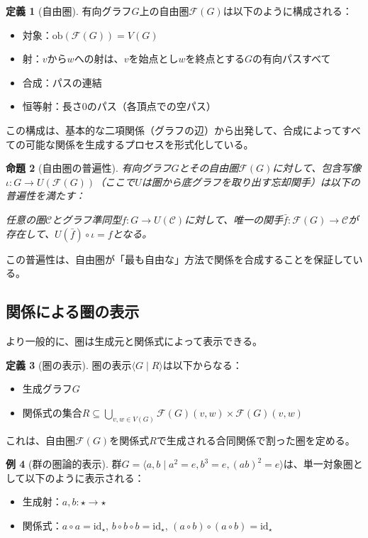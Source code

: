 \documentclass[11pt,a4paper,twocolumn]{ltjsarticle}
\theoremstyle{definition}
\newtheorem{definition}{定義}[section]
\newtheorem{example}[definition]{例}
\theoremstyle{plain}
\newtheorem{proposition}[definition]{命題}
\newcommand{\ob}{\mathrm{ob}}
\newcommand{\id}{\mathrm{id}}
\begin{document}
\begin{definition}[自由圏]
有向グラフ$G$上の自由圏$\mathcal{F}(G)$は以下のように構成される：
\begin{itemize}
\item 対象：$\ob(\mathcal{F}(G)) = V(G)$
\item 射：$v$から$w$への射は、$v$を始点とし$w$を終点とする$G$の有向パスすべて
\item 合成：パスの連結
\item 恒等射：長さ0のパス（各頂点での空パス）
\end{itemize}
\end{definition}

この構成は、基本的な二項関係（グラフの辺）から出発して、合成によってすべての可能な関係を生成するプロセスを形式化している。

\begin{proposition}[自由圏の普遍性]
有向グラフ$G$とその自由圏$\mathcal{F}(G)$に対して、包含写像$\iota: G \to U(\mathcal{F}(G))$（ここで$U$は圏から底グラフを取り出す忘却関手）は以下の普遍性を満たす：

任意の圏$\mathcal{C}$とグラフ準同型$f: G \to U(\mathcal{C})$に対して、唯一の関手$\bar{f}: \mathcal{F}(G) \to \mathcal{C}$が存在して、$U(\bar{f}) \circ \iota = f$となる。
\end{proposition}

この普遍性は、自由圏が「最も自由な」方法で関係を合成することを保証している。

\subsection{関係による圏の表示}

より一般的に、圏は生成元と関係式によって表示できる。

\begin{definition}[圏の表示]
圏の表示$\langle G \mid R \rangle$は以下からなる：
\begin{itemize}
\item 生成グラフ$G$
\item 関係式の集合$R \subseteq \bigcup_{v,w \in V(G)} \mathcal{F}(G)(v, w) \times \mathcal{F}(G)(v, w)$
\end{itemize}
これは、自由圏$\mathcal{F}(G)$を関係式$R$で生成される合同関係で割った圏を定める。
\end{definition}

\begin{example}[群の圏論的表示]
群$G = \langle a, b \mid a^2 = e, b^3 = e, (ab)^2 = e \rangle$は、単一対象圏として以下のように表示される：
\begin{itemize}
\item 生成射：$a, b: \star \to \star$
\item 関係式：$a \circ a = \id_{\star}$, $b \circ b \circ b = \id_{\star}$, $(a \circ b) \circ (a \circ b) = \id_{\star}$
\end{itemize}
\end{example}
\end{document}
